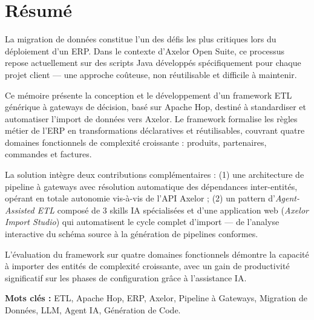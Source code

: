 \chapter*{Résumé}

La migration de données constitue l'un des défis les plus critiques lors du déploiement d'un ERP. Dans le contexte d'Axelor Open Suite, ce processus repose actuellement sur des scripts Java développés spécifiquement pour chaque projet client — une approche coûteuse, non réutilisable et difficile à maintenir.

Ce mémoire présente la conception et le développement d'un framework ETL générique à gateways de décision, basé sur Apache Hop, destiné à standardiser et automatiser l'import de données vers Axelor. Le framework formalise les règles métier de l'ERP en transformations déclaratives et réutilisables, couvrant quatre domaines fonctionnels de complexité croissante : produits, partenaires, commandes et factures.

La solution intègre deux contributions complémentaires : (1) une architecture de pipeline à gateways avec résolution automatique des dépendances inter-entités, opérant en totale autonomie vis-à-vis de l'API Axelor ; (2) un pattern d'\textit{Agent-Assisted ETL} composé de 3 skills IA spécialisées et d'une application web (\textit{Axelor Import Studio}) qui automatisent le cycle complet d'import — de l'analyse interactive du schéma source à la génération de pipelines conformes.

L'évaluation du framework sur quatre domaines fonctionnels démontre la capacité à importer des entités de complexité croissante, avec un gain de productivité significatif sur les phases de configuration grâce à l'assistance IA.

\textbf{Mots clés :} ETL, Apache Hop, ERP, Axelor, Pipeline à Gateways, Migration de Données, LLM, Agent IA, Génération de Code.
